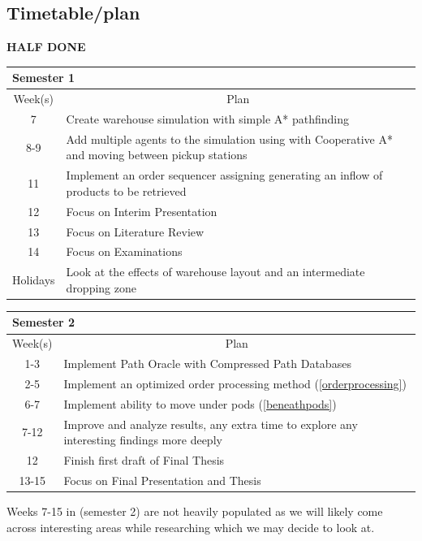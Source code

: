 \documentclass[a4paper,11pt]{article}
\begin{document}
\subsection{Timetable/plan}
\textbf{HALF DONE}
\begin{center}
{\footnotesize
\begin{tabular}{ c p{12cm} }
\multicolumn{2}{l}{\textbf{Semester 1}} \\
\hline \multicolumn{1}{c}{Week(s)} & \multicolumn{1}{c}{Plan} \\
\hline 7  & Create warehouse simulation with simple A* pathfinding \\
\hline 8-9  & Add multiple agents to the simulation using with Cooperative A* and moving between pickup stations \\
\hline 11 & Implement an order sequencer assigning generating an inflow of products to be retrieved \\
\hline 12 & Focus on Interim Presentation \\
\hline 13 & Focus on Literature Review \\
\hline 14 & Focus on Examinations \\
\hline Holidays & Look at the effects of warehouse layout and an intermediate dropping zone \\
\hline
\end{tabular}
}

{\footnotesize
\vspace{0.5cm}
\begin{tabular}{ c p{12cm} }
\multicolumn{2}{l}{\textbf{Semester 2}} \\
\hline \multicolumn{1}{c}{Week(s)} & \multicolumn{1}{c}{Plan} \\
\hline 1-3 & Implement Path Oracle with Compressed Path Databases \\
\hline 2-5 & Implement an optimized order processing method (\ref{orderprocessing}) \\
\hline 6-7 & Implement ability to move under pods (\ref{beneathpods}) \\
\hline 7-12 & Improve and analyze results, any extra time to explore any interesting findings more deeply \\
\hline 12 & Finish first draft of Final Thesis \\
\hline 13-15 & Focus on Final Presentation and Thesis \\
\hline
\end{tabular}
}
\end{center}

Weeks 7-15 in (semester 2) are not heavily populated as we will likely come across interesting areas while researching which we may decide to look at.
\end{document}
